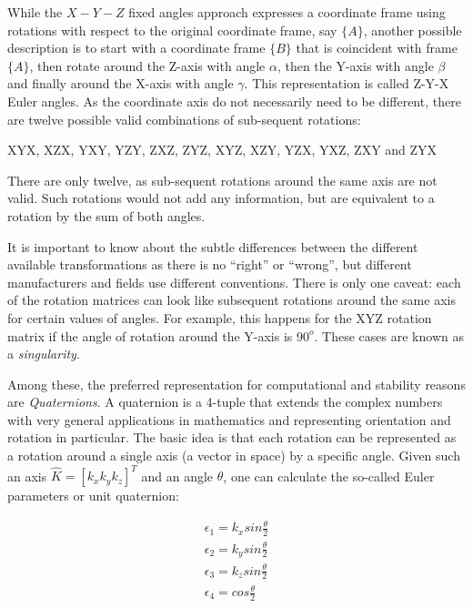 While the $X-Y-Z$ fixed angles approach expresses a coordinate frame using rotations with respect to the original coordinate frame, say $\{A\}$, another possible description is to start with a coordinate frame $\{B\}$ that is coincident with frame $\{A\}$, then rotate around the Z-axis with angle $ \alpha$, then the Y-axis with angle $ \beta$ and finally around the X-axis with angle $ \gamma$. This representation is called Z-Y-X Euler angles.
As the coordinate axis do not necessarily need to be different, there are twelve possible valid combinations of sub-sequent rotations:
\begin{center}
XYX, XZX, YXY, YZY, ZXZ, ZYZ, XYZ, XZY, YZX, YXZ, ZXY and ZYX
\end{center}
There are only twelve, as sub-sequent rotations around the same axis are not valid. Such rotations would not add any information, but are equivalent to a rotation by the sum of both angles.

It is important to know about the subtle differences between the different available transformations as there is no ``right'' or ``wrong'', but different manufacturers and fields use different conventions. There is only one caveat: each of the rotation matrices can look like subsequent rotations around the same axis for certain values of angles. For example, this happens for the XYZ rotation matrix if the angle of rotation around the Y-axis is $90^o$. These cases are known as a \emph{singularity}.

Among these, the preferred representation for computational and stability reasons are \emph{Quaternions}. A quaternion is a 4-tuple that extends the complex numbers with very general applications in mathematics and representing orientation and rotation in particular. The basic idea is that each rotation can be represented as a rotation around a single axis (a vector in space) by a specific angle. Given such an axis $ \hat{K}=[k_x k_y k_z]^T$ and an angle $ \theta$, one can calculate the so-called Euler parameters or unit quaternion:

\begin{eqnarray}
\epsilon_1=k_x sin \frac{\theta}{2}\\
\epsilon_2=k_y sin \frac{\theta}{2}\\
\epsilon_3=k_z sin \frac{\theta}{2}\\
\epsilon_4=cos\frac{\theta}{2}
\end{eqnarray}

